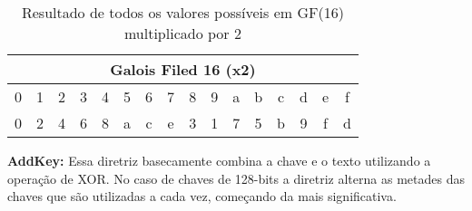\documentclass[runningheads,a4paper,11pt]{llncs}
\begin{document}
\begin{table}[htbp]
	\centering
	\caption{Resultado de todos os valores poss\'iveis em GF(16) multiplicado por 2}
	\begin{tabular}{|c|c|c|c|c|c|c|c|c|c|c|c|c|c|c|c|}
		\hline
		\multicolumn{16}{|c|}{Galois Filed 16 (x2)} \\ \hline
		\hspace{1mm}0\hspace{1mm} & \hspace{1mm}1\hspace{1mm} & \hspace{1mm}2\hspace{1mm} & \hspace{1mm}3\hspace{1mm} & \hspace{1mm}4\hspace{1mm} & \hspace{1mm}5\hspace{1mm} & \hspace{1mm}6\hspace{1mm} & \hspace{1mm}7\hspace{1mm} & \hspace{1mm}8\hspace{1mm} & \hspace{1mm}9\hspace{1mm} & \hspace{1mm}a\hspace{1mm} & \hspace{1mm}b\hspace{1mm} & \hspace{1mm}c\hspace{1mm} & \hspace{1mm}d\hspace{1mm} & \hspace{1mm}e\hspace{1mm} & \hspace{1mm}f\hspace{1mm} \\ \hline
		0 & 2 & 4 & 6 & 8 & a & c & e & 3 & 1 & 7 & 5 & b & 9 & f & d \\ \hline
	\end{tabular}
	\label{tabela:galois}
\end{table}

\noindent\textbf{AddKey:} Essa diretriz basecamente combina a chave e o texto utilizando a opera\c{c}\~ao de XOR. No caso de chaves de 128-bits a diretriz alterna as metades das chaves que s\~ao utilizadas a cada vez, come\c{c}ando da mais significativa.
\end{document}
